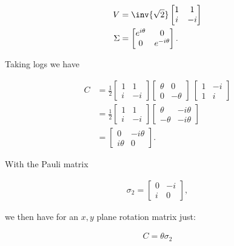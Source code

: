 \begin{align}\label{eqn:rotationUnitary:7}
V &= \inv{\sqrt{2}}
\begin{bmatrix}
1 & 1 \\
i & -i
\end{bmatrix} \\
\Sigma &=
\begin{bmatrix}
e^{i\theta} & 0 \\
0 & e^{-i\theta}
\end{bmatrix}.
\end{align}

Taking logs we have

\begin{align*}
C
&=
\frac{1}{2}
\begin{bmatrix}
1 & 1 \\
i & -i
\end{bmatrix}
\begin{bmatrix}
\theta & 0 \\
0 & -\theta
\end{bmatrix} \
\begin{bmatrix}
1 & -i \\
1 & i
\end{bmatrix} \\
&=
\frac{1}{2}
\begin{bmatrix}
1 & 1 \\
i & -i
\end{bmatrix}
\begin{bmatrix}
\theta  & -i\theta \\
-\theta & -i\theta
\end{bmatrix}  \\
&=
\begin{bmatrix}
0 & -i\theta \\
i\theta & 0
\end{bmatrix}.
\end{align*}

With the Pauli matrix

\begin{align}\label{eqn:rotationUnitary:8a}
\sigma_2 =
\begin{bmatrix}
0 & -i \\
i & 0
\end{bmatrix},
\end{align}

we then have for an $x,y$ plane rotation matrix just:

\begin{align}\label{eqn:rotationUnitary:8}
C = \theta \sigma_2
\end{align}

